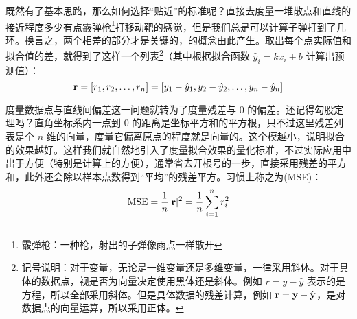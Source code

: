 既然有了基本思路，那么如何选择“贴近”的标准呢？直接去度量一堆散点和直线的接近程度多少有点霰弹枪\footnote{霰弹枪：一种枪，射出的子弹像雨点一样散开}打移动靶的感觉，但是我们总是可以计算子弹打到了几环。换言之，两个相差的部分才是关键的，的概念由此产生。取出每个点实际值和拟合值的差，就得到了这样一个列表\footnote{记号说明：对于变量，无论是一维变量还是多维变量，一律采用斜体。对于具体的数据点，视是否为向量决定使用黑体还是斜体。例如 $r = y - \hat y$ 表示的是方程，所以全部采用斜体。但是具体数据的残差计算，例如 ${\mathbf{r}} = {\mathbf{y}} - \hat {{\mathbf{y}}}$，是对数据点的向量运算，所以采用正体。}（其中根据拟合函数 $\hat y_i = kx_i + b$ 计算出预测值）：
\[
    {\mathbf{r}} = [r_1, r_2, \ldots, r_n] = [y_1 - \hat y_1, y_2 - \hat y_2, \ldots, y_n - \hat y_n]
\]

度量数据点与直线间偏差这一问题就转为了度量残差与 0 的偏差。还记得勾股定理吗？直角坐标系内一点到 0 的距离是坐标平方和的平方根，只不过这里残差列表是个 $n$ 维的向量，度量它偏离原点的程度就是向量的。这个模越小，说明拟合的效果越好。这样我们就自然地引入了度量拟合效果的量化标准，不过实际应用中出于方便（特别是计算上的方便），通常省去开根号的一步，直接采用残差的平方和，此外还会除以样本点数得到“平均”的残差平方。习惯上称之为(MSE)：
\[
    \text{MSE} = \frac1n |{\mathbf{r}}|^2 = \frac1n \sum_{i=1}^n r_i^2
\]

